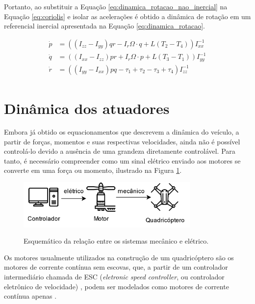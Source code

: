 \documentclass[main.tex]{subfiles}
\begin{document}
Portanto, ao substituir a Equação \ref{eq:dinamica_rotacao_nao_inercial} na Equação \ref{eq:coriolis} e isolar as acelerações é obtido a dinâmica de rotação em um referencial inercial apresentada na Equação \ref{eq:dinamica_rotacao}.

\begin{equation}\label{eq:dinamica_rotacao}
	\begin{split}
		\dot{p} &= \left((I_{zz} - I_{yy})qr - I_r\Omega\cdot q + L(T_2 - T_4)\right)I_{xx}^{-1}\\
		\dot{q} &= \left((I_{xx} - I_{zz})pr + I_r\Omega\cdot p + L(T_3 - T_1)\right)I_{yy}^{-1}\\
		\dot{r} &= \left((I_{yy} - I_{xx})pq -\tau_1 + \tau_2 - \tau_3 + \tau_4\right)I_{zz}^{-1}\\
	\end{split}
\end{equation}

\section{Dinâmica dos atuadores}

Embora já obtido os equacionamentos que descrevem a dinâmica do veículo, a partir de forças, momentos e suas respectivas velocidades, ainda não é possível controlá-lo devido a ausência de uma grandeza diretamente controlável. Para tanto, é necessário compreender como um sinal elétrico enviado aos motores se converte em uma força ou momento, ilustrado na Figura \ref{fig:sistemas_mecanico_eletrico}. 

\begin{figure}[!h]
	\centering
	\caption{Esquemático da relação entre os sistemas mecânico e elétrico.}
	\includegraphics[width=0.8\textwidth]{capitulos/modelagem/imgs/sistema.png}
	\label{fig:sistemas_mecanico_eletrico}
\end{figure}

Os motores usualmente utilizados na construção de um quadricóptero são os motores de corrente contínua sem escovas, que, a partir de um controlador intermediário chamada de ESC (\textit{eletronic speed controller}, ou controlador eletrônico de velocidade) \cite{esc_ref}, podem ser modelados como motores de corrente contínua apenas \cite{popoola2015modelling}. 
\end{document}
